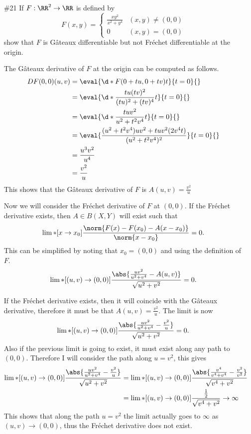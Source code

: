 \documentclass[11pt, oneside]{article}
\begin{document}
\begin{enumerate}
  \pagebreak
  \item[\#21] %
    If $F: \RR^2 \to \RR$ is defined by
    \[
      F(x, y) =
      \begin{cases}
        \frac{xy^2}{x^2 + y^4} & (x, y) \neq (0, 0) \\
        0 & (x, y) = (0, 0)
      \end{cases}
    \]
    show that $F$ is G\^ateaux differentiable but not Fr\'echet differentiable
    at the origin.

    The G\^ateaux derivative of $F$ at the origin can be computed as follows.
    \begin{align*}
      DF(0, 0)(u, v) &= \eval{\d*{F(0 + tu, 0 + tv)}{t}}{t=0}{} \\
      &= \eval{\d*{\frac{tu (tv)^2}{(tu)^2 + (tv)^4}}{t}}{t = 0}{} \\
      &= \eval{\d*{\frac{t uv^2}{u^2 + t^2v^4}}{t}}{t = 0}{} \\
      &= \eval{\frac{(u^2 + t^2v^4)uv^2 + tuv^2(2v^4 t)}{(u^2 + t^2 v^4)^2}}{t = 0}{} \\
      &= \frac{u^3v^2}{u^4} \\
      &= \frac{v^2}{u}
    \end{align*}
    This shows that the G\^ateaux derivative of $F$ is $A(u, v) = \frac{v^2}{u}$

    Now we will consider the Fr\'echet derivative of $F$ at $(0, 0)$.
    If the Fr\'echet derivative exists, then $A \in B(X, Y)$ will exist such
    that
    \[
      \lim*[x \to x_0]{\frac{\norm{F(x) - F(x_0) - A(x - x_0)}}{\norm{x - x_0}}} = 0.
    \]
    This can be simplified by noting that $x_0 = (0, 0)$ and using the
    definition of $F$.
    \[
      \lim*[(u, v) \to (0, 0)]{\frac{\abs{\frac{uv^2}{u^2 + v^4} - A(u, v)}}{\sqrt{u^2 + v^2}}} = 0.
    \]

    If the Fr\'echet derivative exists, then it will coincide with the
    G\^ateaux derivative, therefore it must be that $A(u, v) = \frac{v^2}{u}$.
    The limit is now
    \[
      \lim*[(u, v) \to (0, 0)]{\frac{\abs{\frac{uv^2}{u^2 + v^4} - \frac{v^2}{u}}}{\sqrt{u^2 + v^2}}} = 0.
    \]
    Also if the previous limit is going to exist, it must exist along any path
    to $(0, 0)$.
    Therefore I will consider the path along $u = v^2$, this gives
    \begin{align*}
      \lim*[(u, v) \to (0, 0)]{\frac{\abs{\frac{uv^2}{u^2 + v^4} - \frac{v^2}{u}}}{\sqrt{u^2 + v^2}}} 
      &=  \lim*[(u, v) \to (0, 0)]{\frac{\abs{\frac{v^4}{v^4 + v^4} - \frac{v^2}{v^2}}}{\sqrt{v^4 + v^2}}} \\
      &=  \lim*[(u, v) \to (0, 0)]{\frac{\frac{1}{2}}{\sqrt{v^4 + v^2}}} \to \infty\\
    \end{align*}
    This shows that along the path $u = v^2$ the limit actually goes to
    $\infty$ as $(u, v) \to (0, 0)$, thus the Fr\'echet derivative does not exist.


\end{enumerate}
\end{document}
